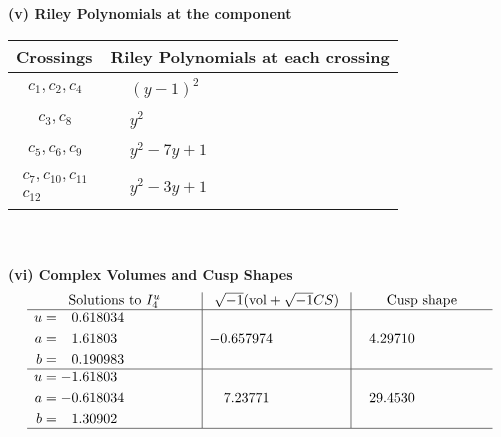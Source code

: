 \documentclass[1p]{elsarticle_modified}
\theoremstyle{definition}
\newcommand{\I}{\sqrt{-1}}
\begin{document}
\newpage\renewcommand{\arraystretch}{1}
\flushleft \textbf{(v) Riley Polynomials at the component}\newline \\
\begin{tabular}{m{50pt}|m{274pt}}
Crossings & \hspace{64pt}Riley Polynomials at each crossing \\
\hline $$\begin{aligned}c_{1},c_{2},c_{4}\end{aligned}$$&$\begin{aligned}
&(y-1)^2
\end{aligned}$\\
\hline $$\begin{aligned}c_{3},c_{8}\end{aligned}$$&$\begin{aligned}
&y^2
\end{aligned}$\\
\hline $$\begin{aligned}c_{5},c_{6},c_{9}\end{aligned}$$&$\begin{aligned}
&y^2-7 y+1
\end{aligned}$\\
\hline $$\begin{aligned}c_{7},c_{10},c_{11}\\c_{12}\end{aligned}$$&$\begin{aligned}
&y^2-3 y+1
\end{aligned}$\\
\hline
\end{tabular}\\~\\
\newpage\flushleft \textbf{(vi) Complex Volumes and Cusp Shapes}
$$\begin{array}{c|c|c}  
\text{Solutions to }I^u_{4}& \I (\text{vol} + \sqrt{-1}CS) & \text{Cusp shape}\\
 \hline 
\begin{aligned}
u &= \phantom{-}0.618034\phantom{ +0.000000I} \\
a &= \phantom{-}1.61803\phantom{ +0.000000I} \\
b &= \phantom{-}0.190983\phantom{ +0.000000I}\end{aligned}
 & -0.657974\phantom{ +0.000000I} & \phantom{-}4.29710\phantom{ +0.000000I} \\ \hline\begin{aligned}
u &= -1.61803\phantom{ +0.000000I} \\
a &= -0.618034\phantom{ +0.000000I} \\
b &= \phantom{-}1.30902\phantom{ +0.000000I}\end{aligned}
 & \phantom{-}7.23771\phantom{ +0.000000I} & \phantom{-}29.4530\phantom{ +0.000000I}\\
 \hline 
 \end{array}$$\newpage\newpage\renewcommand{\arraystretch}{1}
\end{document}
